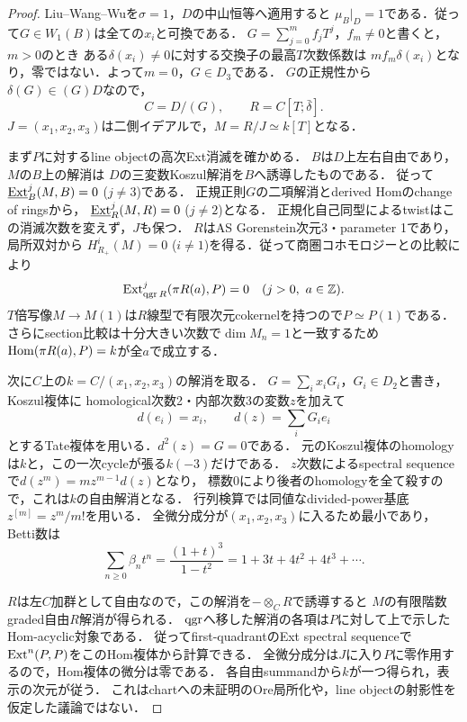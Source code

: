 \begin{proof}
Liu--Wang--Wu\cite[Theorem 3.3]{LWWOre}を$\sigma=1$，$D$の中山恒等へ適用すると
$\mu_B|_D=1$である．従って$G\in W_1(B)$は全ての$x_i$と可換である．
$G=\sum_{j=0}^m f_jT^j$，$f_m\ne0$と書くと，$m>0$のとき
ある$\delta(x_i)\ne0$に対する交換子の最高$T$次数係数は
$m f_m\delta(x_i)$となり，零ではない．よって$m=0$，$G\in D_3$である．
$G$の正規性から$\delta(G)\in(G)D$なので，
\[
 C=D/(G),\qquad R=C[T;\bar\delta].
\]
$J=(x_1,x_2,x_3)$は二側イデアルで，$M=R/J\simeq k[T]$となる．

まず$P$に対するline objectの高次Ext消滅を確かめる．
$B$は$D$上左右自由であり，$M$の$B$上の解消は
$D$の三変数Koszul解消を$B$へ誘導したものである．
従って$\underline{\operatorname{Ext}}_B^j(M,B)=0$ ($j\ne3$)である．
正規正則$G$の二項解消とderived Homのchange of ringsから，
$\underline{\operatorname{Ext}}_R^j(M,R)=0$ ($j\ne2$)となる．
正規化自己同型によるtwistはこの消滅次数を変えず，$J$も保つ．
$R$はAS Gorenstein次元3・parameter 1であり，局所双対から
$H^i_{R_+}(M)=0$ ($i\ne1$)を得る．従って商圏コホモロジーとの比較により
\[
 \Ext^j_{\qgr R}(\pi R(a),P)=0\quad(j>0,\ a\in\mathbb Z).
\]
$T$倍写像$M\to M(1)$は$R$線型で有限次元cokernelを持つので$P\simeq P(1)$である．
さらにsection比較は十分大きい次数で$\dim M_n=1$と一致するため
$\operatorname{Hom}(\pi R(a),P)=k$が全$a$で成立する．

次に$C$上の$k=C/(x_1,x_2,x_3)$の解消を取る．
$G=\sum_i x_iG_i$，$G_i\in D_2$と書き，Koszul複体に
homological次数2・内部次数3の変数$z$を加えて
\[
 d(e_i)=x_i,\qquad d(z)=\sum_iG_ie_i
\]
とするTate複体を用いる．$d^2(z)=G=0$である．
元のKoszul複体のhomologyは$k$と，この一次cycleが張る$k(-3)$だけである．
$z$次数によるspectral sequenceで$d(z^m)=m z^{m-1}d(z)$となり，
標数0により後者のhomologyを全て殺すので，これは$k$の自由解消となる．
行列検算では同値なdivided-power基底$z^{[m]}=z^m/m!$を用いる．
全微分成分が$(x_1,x_2,x_3)$に入るため最小であり，Betti数は
\[
 \sum_{n\ge0}\beta_nt^n=\frac{(1+t)^3}{1-t^2}
 =1+3t+4t^2+4t^3+\cdots.
\]

$R$は左$C$加群として自由なので，この解消を$-\otimes_CR$で誘導すると
$M$の有限階数graded自由$R$解消が得られる．
$\operatorname{qgr}$へ移した解消の各項は$P$に対して上で示したHom-acyclic対象である．
従ってfirst-quadrantのExt spectral sequenceで$\operatorname{Ext}^n(P,P)$をこのHom複体から計算できる．
全微分成分は$J$に入り$P$に零作用するので，Hom複体の微分は零である．
各自由summandから$k$が一つ得られ，表示の次元が従う．
これはchartへの未証明のOre局所化や，line objectの射影性を仮定した議論ではない．
\end{proof}

